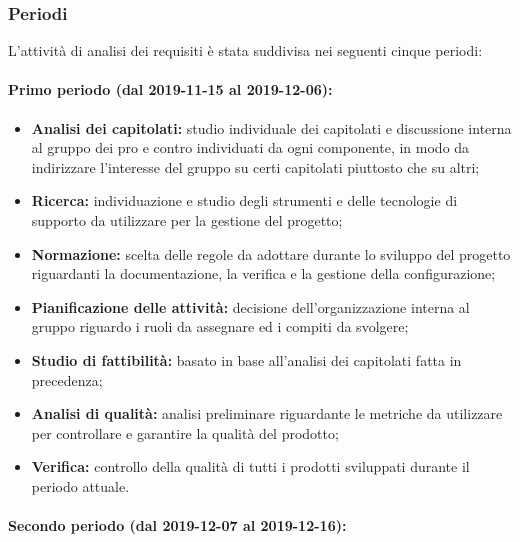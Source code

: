 		\subsubsection{Periodi}
		
			L'attività di analisi dei requisiti è stata suddivisa nei seguenti cinque periodi:
			
			\paragraph{Primo periodo (dal 2019-11-15 al 2019-12-06):}
			
				\begin{itemize}
					\item \textbf{Analisi dei capitolati:} studio individuale dei capitolati e discussione interna al gruppo dei pro e contro individuati da ogni componente, in modo da indirizzare l'interesse del gruppo su certi capitolati piuttosto che su altri;
					\item \textbf{Ricerca:} individuazione e studio degli strumenti e delle tecnologie di supporto da utilizzare per la gestione del progetto;
					\item \textbf{Normazione:} scelta delle regole da adottare durante lo sviluppo del progetto riguardanti la documentazione, la verifica e la gestione della configurazione;
					\item \textbf{Pianificazione delle attività:} decisione dell'organizzazione interna al gruppo riguardo i ruoli da assegnare ed i compiti da svolgere;
					\item \textbf{Studio di fattibilità:} basato in base all'analisi dei capitolati fatta in precedenza;
					\item \textbf{Analisi di qualità:} analisi preliminare riguardante le metriche da utilizzare per controllare e garantire la qualità del prodotto;
					\item \textbf{Verifica:} controllo della qualità di tutti i prodotti sviluppati durante il periodo attuale.
				\end{itemize}
			
			\paragraph{Secondo periodo (dal 2019-12-07 al 2019-12-16):}
			
